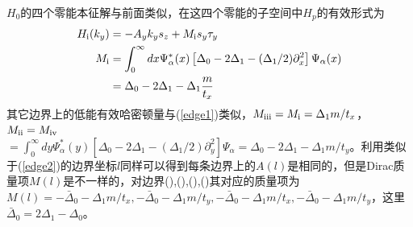 $H_0$的四个零能本征解与前面类似，在这四个零能的子空间中$H_p$的有效形式为
\begin{equation}
\begin{aligned}
H_{\mathrm{\uppercase\expandafter{\romannumeral1}}}(k_y)&=-A_yk_ys_z+M_{\mathrm{\uppercase\expandafter{\romannumeral1}}}s_y\tau_y\\
M_{\mathrm{\uppercase\expandafter{\romannumeral1}}}&=\int_{0}^\infty dx\Psi_\alpha^{*}(x)\left[\Delta_0-2\Delta_1-(\Delta_1/2)\partial_x^2\right]\Psi_\alpha(x)\\&=\Delta_0-2\Delta_1-\Delta_1\frac{m}{t_x}
\end{aligned}
\end{equation}
其它边界上的低能有效哈密顿量与(\ref{edge1})类似，$M_{\mathrm{\uppercase\expandafter{\romannumeral3}}}=M_{\mathrm{\uppercase\expandafter{\romannumeral1}}}=\Delta_1m/t_x$，$M_{\mathrm{\uppercase\expandafter{\romannumeral2}}}=M_{\mathrm{\uppercase\expandafter{\romannumeral4}}}$\\$=\int_{0}^{\infty}dy\Psi_\alpha^{*}(y)\left[\Delta_0-2\Delta_1-(\Delta_1/2)\partial^2_y\right]\Psi_\alpha=\Delta_0-2\Delta_1-\Delta_1m/t_y$。利用类似于(\ref{edge2})的边界坐标$l$同样可以得到每条边界上的$A(l)$是相同的，但是Dirac质量项$M(l)$是不一样的，对边界(\uppercase\expandafter{}),(\uppercase\expandafter{}),(\uppercase\expandafter{}),(\uppercase\expandafter{})其对应的质量项为$M(l)=-\bar{\Delta}_0-\Delta_1m/t_x,-\bar{\Delta
}_0-\Delta_1m/t_y,-\bar{\Delta}_0-\Delta_1m/t_x,-\bar{\Delta}_0-\Delta_1m/t_y$，这里$\bar{\Delta}_0=2\Delta_1-\Delta_0$。


